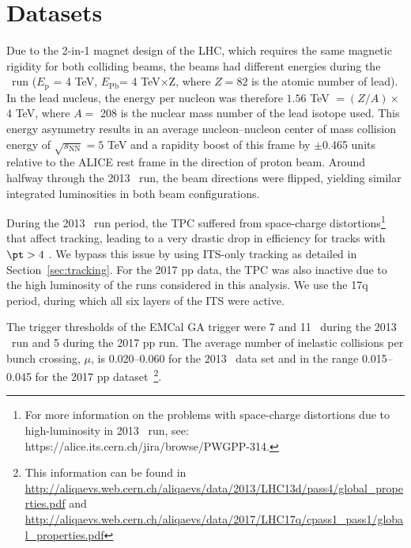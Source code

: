 \section{Datasets}
\label{sec:datasets}


Due to the 2-in-1 magnet design of the LHC, which requires the same magnetic rigidity for both colliding beams, the beams had different energies during the \pPb~run ({$E_{\mathrm{p}}$ = 4 TeV}, {$E_{\mathrm{Pb}} $= 4 TeV$\times$Z}, where $Z=82$ is the atomic number of lead). In the lead nucleus, the energy per nucleon was therefore  {$1.56$ TeV $= (Z/A) \times$ 4 TeV}, where $A =$ 208 is the nuclear
mass number of the lead isotope used. This energy asymmetry results in an average nucleon--nucleon center of mass collision energy of {$\sqrt{s_{\mathrm{NN}}}=5 $ TeV} and a rapidity boost of this frame by $\pm$0.465 units relative to the ALICE rest frame in the direction of proton beam. Around halfway through the 2013 \pPb~run, the beam directions were flipped, yielding similar integrated luminosities in both beam configurations. %

During the 2013 \pPb~run period, the TPC suffered from space-charge distortions\footnote{For more information on the problems with space-charge distortions due to high-luminosity in 2013 \pPb~run, see: https://alice.its.cern.ch/jira/browse/PWGPP-314.} that affect tracking, leading to a very drastic drop in efficiency for tracks with $\pt> 4$ \GeVc. We bypass this issue by using ITS-only tracking as detailed in Section~\ref{sec:tracking}.
For the 2017 pp data, the TPC was also inactive due to the high luminosity of the runs considered in this analysis. We use the 17q period, during which all six layers of the ITS were active.

The trigger thresholds of the EMCal GA trigger were 7 and 11 \GeVc~during the 2013 \pPb~run and {5 \GeVc} during the 2017 pp run. The average number of inelastic collisions per bunch crossing, $\mu$, is 0.020--0.060 for the 2013 \pPb~data set and in the range 0.015--0.045 for the 2017 pp dataset~\footnote{This information can be found in \url{http://aliqaevs.web.cern.ch/aliqaevs/data/2013/LHC13d/pass4/global_properties.pdf} and \url{http://aliqaevs.web.cern.ch/aliqaevs/data/2017/LHC17q/cpass1_pass1/global_properties.pdf}}. %

